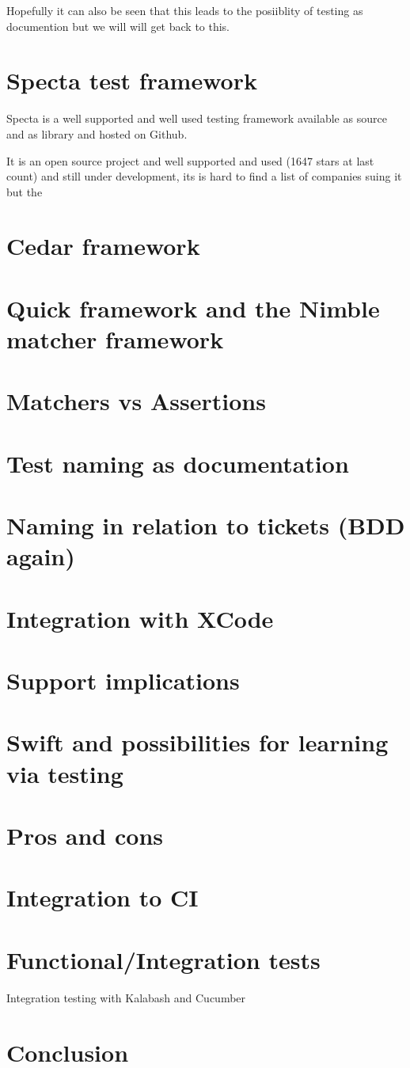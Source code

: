 \documentclass[a4paper, titlepage]{article}
\begin{document}
  Hopefully it can also be seen that this leads to the posiiblity of
  testing as documention but we will will get back to this.
\section{Specta test framework}
  Specta is a well supported and well used testing framework available
  as source and as library and hosted on Github.

  It is an open source project and well supported and used (1647 stars
  at last count) and still under development, its is hard to find a list
  of companies suing it but the 
\section{Cedar framework}
\section{Quick framework and the Nimble matcher framework}
\section{Matchers vs Assertions}
\section{Test naming as documentation}
\section{Naming in relation to tickets (BDD again)}
\section{Integration with XCode}
\section{Support implications}
  \section{Swift and possibilities for learning via testing}
\section{Pros and cons}
\section{Integration to CI}
\section{Functional/Integration tests}\label{sec:integration tests}
  Integration testing with Kalabash and Cucumber
\section{Conclusion}
  
\end{document}
